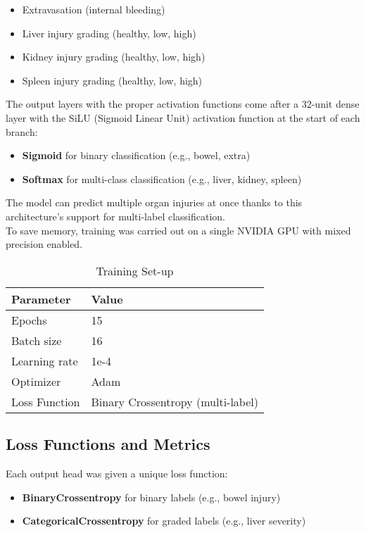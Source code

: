 \documentclass[a4paper,12pt]{article}
\begin{document}
\begin{itemize}

    \item Extravasation (internal bleeding)
    \item Liver injury grading (healthy, low, high)
    \item Kidney injury grading (healthy, low, high)
    \item Spleen injury grading (healthy, low, high)
\end{itemize}
The output layers with the proper activation functions come after a 32-unit dense layer with the SiLU (Sigmoid Linear Unit) activation function at the start of each branch:
\begin{itemize}

    \item \textbf{Sigmoid} for binary classification (e.g., bowel, extra)
    \item \textbf{Softmax} for multi-class classification (e.g., liver, kidney, spleen)
\end{itemize}
The model can predict multiple organ injuries at once thanks to this architecture's support for multi-label classification.\\
To save memory, training was carried out on a single NVIDIA GPU with mixed precision enabled.
\begin{table}[!htbp]
    \centering
    \begin{tabular}{|l|l|}
        \hline
        \textbf{Parameter} & \textbf{Value} \\
        \hline
        Epochs & 15 \\
        Batch size & 16 \\
        Learning rate & 1e-4 \\
        Optimizer & Adam \\
        Loss Function & Binary Crossentropy (multi-label) \\
        \hline
    \end{tabular}
    \caption{Training Set-up}
    \label{tab:training_setup}
\end{table}


\subsection{Loss Functions and Metrics}

Each output head was given a unique loss function:

\begin{itemize}
    \item \textbf{BinaryCrossentropy} for binary labels (e.g., bowel injury)
    \item \textbf{CategoricalCrossentropy} for graded labels (e.g., liver severity)
\end{itemize}
\end{document}
